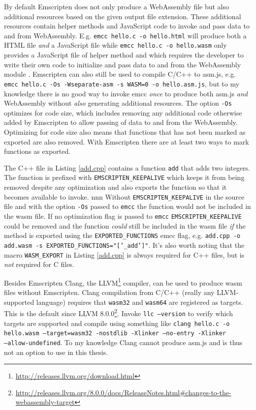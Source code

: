 By default Emscripten does not only produce a WebAssembly file but also additional resources based on the given output file extension. These additional resources contain helper methods and JavaScript code to invoke and pass data to and from WebAssembly. E.g. \texttt{emcc hello.c -o hello.html} will produce both a HTML file \emph{and} a JavaScript file while \texttt{emcc hello.c -o hello.wasm} only provides a JavaScript file of helper method and which requires the developer to write their own code to initialize and pass data to and from the WebAssembly module \parencite{Rourke2018}. Emscripten can also still be used to compile C/C++ to asm.js, e.g. \texttt{emcc hello.c -Os -Wseparate-asm -s WASM=0 -o hello.asm.js}, but to my knowledge there is no good way to invoke emcc \emph{once} to produce both asm.js \emph{and} WebAssembly without \emph{also} generating additional resources. The option \texttt{-Os} optimizes for code size, which includes removing any additional code otherwise added by Emscripten to allow passing of data to and from the WebAssembly. Optimizing for code size also means that functions that has not been marked as exported are also removed. With Emscripten there are at least two ways to mark functions as exported. 



The C++ file in Listing \ref{add.cpp} contains a function \texttt{add} that adds two integers. The function is prefixed with \texttt{EMSCRIPTEN\_KEEPALIVE} which keeps it from being removed despite any optimization and also exports the function so that it becomes available to invoke. nnn Without \texttt{EMSCRIPTEN\_KEEPALIVE} in the source file and with the option \texttt{-Os} passed to \texttt{emcc} the function would not be included in the wasm file. If no optimization flag is passed to \texttt{emcc} \texttt{EMSCRIPTEN\_KEEPALIVE} could be removed and the function \emph{could} still be included in the wasm file \emph{if} the method is exported using 
the \texttt{EXPORTED\_FUNCTIONS} emcc flag, e.g. \texttt{add.cpp -o add.wasm -s  EXPORTED\_FUNCTIONS="['\_add']"}. It's also worth noting that the macro \texttt{WASM\_EXPORT} in Listing \ref{add.cpp} is always required for C++ files, but is \emph{not} required for C files.


Besides Emscripten Clang, the LLVM\footnote{\url{http://releases.llvm.org/download.html}} compiler, can be used to produce wasm files without Emscripten. Clang compilation from C/C++ (really any LLVM-supported language) requires that \texttt{wasm32} and \texttt{wasm64} are registered as targets. This is the default since LLVM 8.0.0\footnote{\url{http://releases.llvm.org/8.0.0/docs/ReleaseNotes.html\#changes-to-the-webassembly-target}}. Invoke \texttt{llc --version} to verify which targets are supported and compile using something like \texttt{clang hello.c -o hello.wasm --target=wasm32 -nostdlib -Xlinker --no-entry -Xlinker\\ --allow-undefined}. To my knowledge Clang cannot produce asm.js and is thus not an option to use in this thesis.

